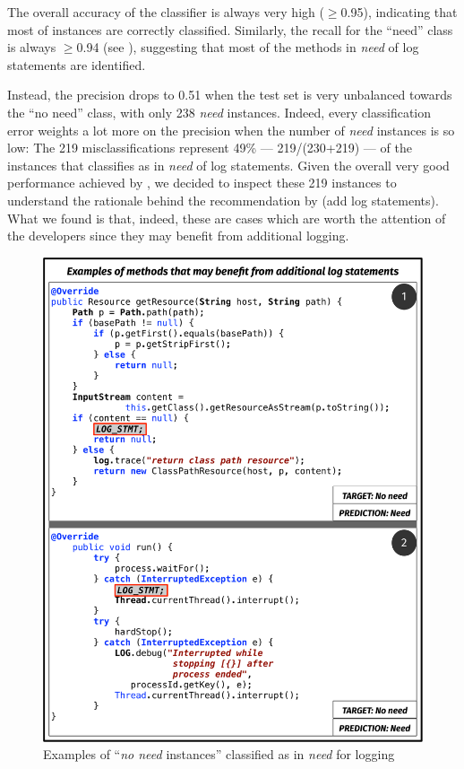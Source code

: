 The overall accuracy of the classifier is always very high ($\geq$0.95), indicating that most of instances are correctly classified. Similarly, the recall for the ``need'' class is always $\geq$0.94 (see ), suggesting that most of the methods in \emph{need} of log statements are identified. 

Instead, the precision drops to 0.51 when the test set is very unbalanced towards the ``no need'' class, with only 238 \emph{need} instances. Indeed, every classification error weights a lot more on the precision when the number of \emph{need} instances is so low: The 219 misclassifications represent 49\% --- 219/(230+219) --- of the instances that \approach classifies as in \emph{need} of log statements. Given the overall very good performance achieved by \approach, we decided to inspect these 219 instances to understand the rationale behind the recommendation by \approach (\ie add log statements). What we found is that, indeed, these are cases which are worth the attention of the developers since they may benefit from additional logging. 

\begin{figure}[h!]
	\centering
	\includegraphics[width=0.70\columnwidth]{img/2-98-examples.pdf}
	\vspace{-0.2cm}
	\caption{Examples of ``\emph{no need} instances'' classified as in \emph{need} for logging}
	\label{fig:no-need}
	\vspace{-0.3cm}
\end{figure}

